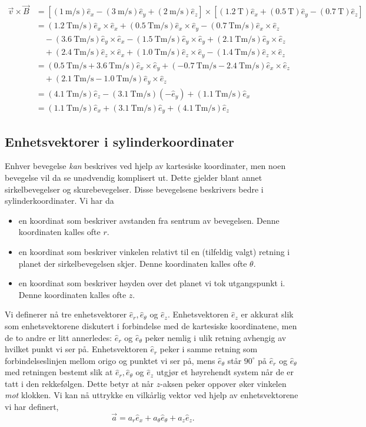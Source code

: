 \documentclass[a4paper,norsk,12pt]{book}
\def\ex{\ensuremath{\hat{e}_x}}
\def\ey{\ensuremath{\hat{e}_y}}
\def\ez{\ensuremath{\hat{e}_z}}
\def\er{\ensuremath{\hat{e}_r}}
\def\eth{\ensuremath{\hat{e}_\theta}}
\begin{document}
\begin{displaymath}
\begin{aligned}
	\vec{v}\times\vec{B} &= \left[ (1~\mathrm{m/s})\ex - (3~\mathrm{m/s})\ey + (2~\mathrm{m/s})\ez \right] \times
	\left[(1.2~\mathrm{T})\ex + (0.5~\mathrm{T})\ey - (0.7~\mathrm{T})\ez\right] \\
	&= (1.2~\mathrm{Tm/s})\ex\times\ex + (0.5~\mathrm{Tm/s})\ex\times\ey -  (0.7~\mathrm{Tm/s})\ex\times\ez \\
	&\quad- (3.6~\mathrm{Tm/s})\ey\times\ex- (1.5~\mathrm{Tm/s})\ey\times\ey+ (2.1~\mathrm{Tm/s})\ey\times\ez \\
	&\quad+ (2.4~\mathrm{Tm/s})\ez\times\ex+ (1.0~\mathrm{Tm/s})\ez\times\ey -  (1.4~\mathrm{Tm/s})\ez\times\ez \\
	&=(0.5~\mathrm{Tm/s}+3.6~\mathrm{Tm/s})\ex\times\ey + (-0.7~\mathrm{Tm/s}-2.4~\mathrm{Tm/s})\ex\times\ez \\
	&\quad+(2.1~\mathrm{Tm/s}-1.0~\mathrm{Tm/s})\ey\times\ez \\
	&=(4.1~\mathrm{Tm/s})\ez - (3.1~\mathrm{Tm/s})(-\ey) +(1.1~\mathrm{Tm/s})\ex \\
	&=(1.1~\mathrm{Tm/s})\ex + (3.1~\mathrm{Tm/s})\ey + (4.1~\mathrm{Tm/s})\ez
\end{aligned}
\end{displaymath}

\subsection{Enhetsvektorer i sylinderkoordinater}
Enhver bevegelse \emph{kan} beskrives ved hjelp av kartesiske koordinater, men noen bevegelse vil da se unødvendig komplisert ut. Dette gjelder blant annet sirkelbevegelser og skurebevegelser. Disse bevegelsene beskrivers bedre i sylinderkoordinater. Vi har da
\begin{itemize}
\item
 en koordinat som beskriver avstanden fra sentrum av bevegelsen. Denne koordinaten kalles ofte $r$.
\item
 en koordinat som beskriver vinkelen relativt til en (tilfeldig valgt) retning i planet der sirkelbevegelsen skjer. Denne koordinaten kalles ofte $\theta$.
\item
en koordinat som beskriver høyden over det planet vi tok utgangspunkt i. Denne koordinaten kalles ofte $z$. 
\end{itemize}
Vi definerer nå tre enhetsvektorer $\er, \eth$ og $\ez$. Enhetsvektoren $\ez$ er akkurat slik som enhetsvektorene diskutert i forbindelse med de kartesiske koordinatene, men de to andre er litt annerledes: $\er$ og $\eth$ peker nemlig i ulik retning avhengig av hvilket punkt vi ser på. Enhetsvektoren $\er$ peker i samme retning som forbindelseslinjen mellom origo og punktet vi ser på, mens $\eth$ står $90^\circ$ på $\er$ og $\eth$ med retningen bestemt slik at $\er, \eth$ og $\ez$ utgjør et høyrehendt system når de er tatt i den rekkefølgen. Dette betyr at når $z$-aksen peker oppover øker vinkelen \emph{mot} klokken. Vi kan nå uttrykke en vilkårlig vektor ved hjelp av enhetsvektorene vi har definert,
\begin{displaymath}
	\vec{a} = a_r\ex + a_\theta\eth + a_z\ez.
\end{displaymath}
\end{document}
